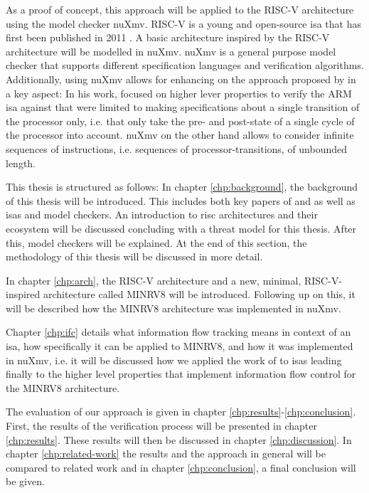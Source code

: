 As a proof of concept, this approach will be applied to the RISC-V architecture using the model checker nuXmv.
RISC-V is a young and open-source \gls{isa} that has first been published in 2011 \cite{RiscVISA-org}.
A basic architecture inspired by the RISC-V architecture will be modelled in nuXmv.
nuXmv is a general purpose model checker that supports different specification languages and verification algorithms.
Additionally, using nuXmv allows for enhancing on the approach proposed by \citeauthor{Reid17} in a key aspect:
In his work, \citeauthor{Reid17} focused on higher lever properties to verify the ARM \gls{isa} against that were limited to making specifications about a single transition of the processor only, i.e. that only take the pre- and post-state of a single cycle of the processor into account.
nuXmv on the other hand allows to consider infinite sequences of instructions, i.e. sequences of processor-transitions, of unbounded length.

This thesis is structured as follows:
In chapter \ref{chp:background}, the background of this thesis will be introduced.
This includes both key papers of \citeauthor{Reid17} and \citeauthor{Ferraiuolo17} as well as \glspl{isa} and model checkers.
An introduction to \gls{risc} architectures and their ecosystem will be discussed concluding with a threat model for this thesis.
After this, model checkers will be explained.
At the end of this section, the methodology of this thesis will be discussed in more detail.

In chapter \ref{chp:arch}, the RISC-V architecture and a new, minimal, RISC-V-inspired architecture called MINRV8 will be introduced.
Following up on this, it will be described how the MINRV8 architecture was implemented in nuXmv.

Chapter \ref{chp:ifc} details what information flow tracking means in context of an \gls{isa}, how specifically it can be applied to MINRV8, and how it was implemented in nuXmv, i.e. it will be discussed how we applied the work of \citeauthor{Ferraiuolo17} \cite{Ferraiuolo17} to \glspl{isa} leading finally to the higher level properties that implement information flow control for the MINRV8 architecture.

The evaluation of our approach is given in chapter \ref{chp:results}-\ref{chp:conclusion}.
First, the results of the verification process will be presented in chapter \ref{chp:results}.
These results will then be discussed in chapter \ref{chp:discussion}.
In chapter \ref{chp:related-work} the results and the approach in general will be compared to related work and in chapter \ref{chp:conclusion}, a final conclusion will be given.


